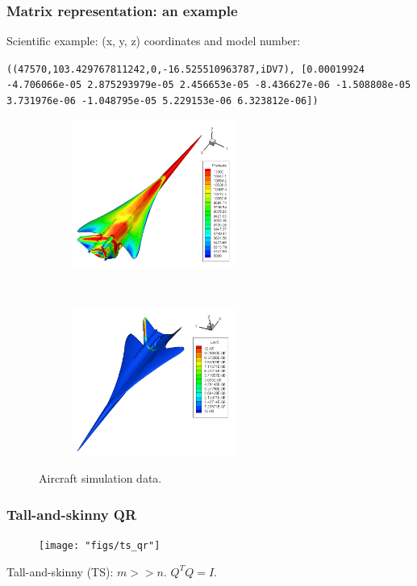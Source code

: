 \documentclass{beamer}
\begin{document}
\begin{frame}
\frametitle{Matrix representation: an example}
Scientific example: (x, y, z) coordinates and model number: \\

\vspace{0.1in}

\texttt{(\footnotesize{(47570,103.429767811242,0,-16.525510963787,iDV7)}, 
\scriptsize{[0.00019924 -4.706066e-05 2.875293979e-05 2.456653e-05 -8.436627e-06 -1.508808e-05 3.731976e-06 -1.048795e-05 5.229153e-06 6.323812e-06])}}

\begin{figure}
        \centering
	\begin{subfigure}[b]{0.48\textwidth}
	\centering
	\includegraphics[height=1.9in]{"figs/pressure"}
	\end{subfigure}
        ~ %
	\begin{subfigure}[b]{0.48\textwidth}
	\centering
	\includegraphics[height=1.9in]{"figs/leverage3"}
	\end{subfigure}
	\caption{Aircraft simulation data.}
\end{figure}
\end{frame}

\begin{frame}
\frametitle{Tall-and-skinny QR}
\begin{figure}
\centering
\texttt{[image: "figs/ts\_qr"]}
\end{figure}

Tall-and-skinny (TS): $m >> n$.  $Q^TQ = I$.
\end{frame}
\end{document}
